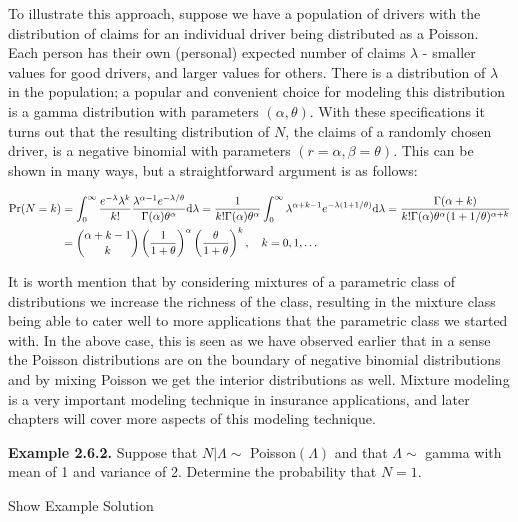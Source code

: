 \documentclass[]{book}
\theoremstyle{definition}
\theoremstyle{definition}
\theoremstyle{definition}
\theoremstyle{remark}
\begin{document}
To illustrate this approach, suppose we have a population of drivers
with the distribution of claims for an individual driver being
distributed as a Poisson. Each person has their own (personal) expected
number of claims \(\lambda\) - smaller values for good drivers, and
larger values for others. There is a distribution of \(\lambda\) in the
population; a popular and convenient choice for modeling this
distribution is a gamma distribution with parameters
\((\alpha, \theta)\). With these specifications it turns out that the
resulting distribution of \(N\), the claims of a randomly chosen driver,
is a negative binomial with parameters \((r=\alpha,\beta=\theta)\). This
can be shown in many ways, but a straightforward argument is as follows:

\begin{align*}
\Pr(N=k)&= \int_0^\infty \frac{e^{-\lambda}\lambda^k}{k!} \frac{\lambda^{\alpha-1}e^{-\lambda/\theta}}{\Gamma{(\alpha)}\theta^{\alpha}} {\rm d}\lambda =
\frac{1}{k!\Gamma(\alpha)\theta^\alpha}\int_0^\infty \lambda^{\alpha+k-1}e^{-\lambda(1+1/\theta)}{\rm d}\lambda=\frac{\Gamma{(\alpha+k)}}{k!\Gamma(\alpha)\theta^\alpha(1+1/\theta)^{\alpha+k}} \\
&=\binom{\alpha+k-1}{k}\left(\frac{1}{1+\theta}\right)^\alpha\left(\frac{\theta}{1+\theta}\right)^k, \quad k=0,1,\ldots
\end{align*}

It is worth mention that by considering mixtures of a parametric class
of distributions we increase the richness of the class, resulting in the
mixture class being able to cater well to more applications that the
parametric class we started with. In the above case, this is seen as we
have observed earlier that in a sense the Poisson distributions are on
the boundary of negative binomial distributions and by mixing Poisson we
get the interior distributions as well. Mixture modeling is a very
important modeling technique in insurance applications, and later
chapters will cover more aspects of this modeling technique.

\textbf{Example 2.6.2.} Suppose that \(N|\Lambda \sim\)
Poisson\((\Lambda)\) and that \(\Lambda \sim\) gamma with mean of 1 and
variance of 2. Determine the probability that \(N=1\).

Show Example Solution
\end{document}
